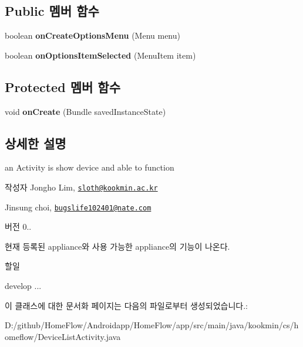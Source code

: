 \subsection*{Public 멤버 함수}
\begin{DoxyCompactItemize}
\item 
\hypertarget{classkookmin_1_1cs_1_1homeflow_1_1_device_list_activity_a24518f31fe0724be786fc7682a077d9d}{}boolean {\bfseries on\+Create\+Options\+Menu} (Menu menu)\label{classkookmin_1_1cs_1_1homeflow_1_1_device_list_activity_a24518f31fe0724be786fc7682a077d9d}

\item 
\hypertarget{classkookmin_1_1cs_1_1homeflow_1_1_device_list_activity_aa9cced735407297a166b944d58b4f416}{}boolean {\bfseries on\+Options\+Item\+Selected} (Menu\+Item item)\label{classkookmin_1_1cs_1_1homeflow_1_1_device_list_activity_aa9cced735407297a166b944d58b4f416}

\end{DoxyCompactItemize}
\subsection*{Protected 멤버 함수}
\begin{DoxyCompactItemize}
\item 
\hypertarget{classkookmin_1_1cs_1_1homeflow_1_1_device_list_activity_a22ce55d384f34491240185b26126007b}{}void {\bfseries on\+Create} (Bundle saved\+Instance\+State)\label{classkookmin_1_1cs_1_1homeflow_1_1_device_list_activity_a22ce55d384f34491240185b26126007b}

\end{DoxyCompactItemize}


\subsection{상세한 설명}
an Activity is show device and able to function 

\begin{DoxyAuthor}{작성자}
Jongho Lim, \href{mailto:sloth@kookmin.ac.kr}{\tt sloth@kookmin.\+ac.\+kr} 

Jinsung choi, \href{mailto:bugslife102401@nate.com}{\tt bugslife102401@nate.\+com} 
\end{DoxyAuthor}
\begin{DoxyVersion}{버전}
0..
\end{DoxyVersion}
현재 등록된 appliance와 사용 가능한 appliance의 기능이 나온다. \begin{DoxyRefDesc}{할일}
\item[\hyperlink{todo__todo000002}{할일}]develop ... \end{DoxyRefDesc}


이 클래스에 대한 문서화 페이지는 다음의 파일로부터 생성되었습니다.\+:\begin{DoxyCompactItemize}
\item 
D\+:/github/\+Home\+Flow/\+Androidapp/\+Home\+Flow/app/src/main/java/kookmin/cs/homeflow/Device\+List\+Activity.\+java\end{DoxyCompactItemize}
